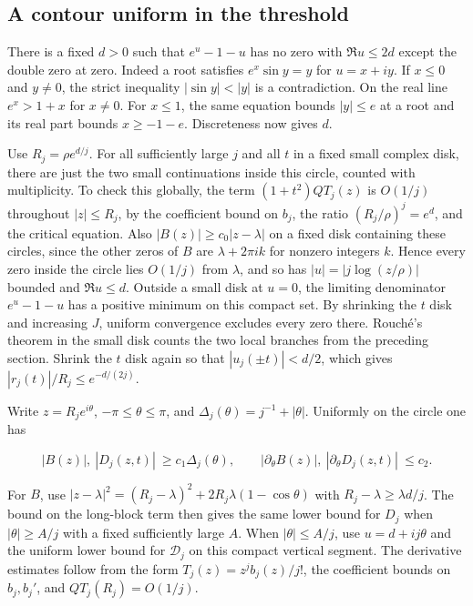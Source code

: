 \documentclass[11pt]{article}
\begin{document}
\subsection{A contour uniform in the threshold}
\label{sec:a-contour-uniform-in-the-threshold}

There is a fixed \(d>0\) such that \(e^u-1-u\) has no zero with \(\Re u\le2d\) except the double zero at zero. Indeed a root satisfies \(e^x\sin y=y\) for \(u=x+iy\). If \(x\le0\) and \(y\ne0\), the strict inequality \(|\sin y|<|y|\) is a contradiction. On the real line \(e^x>1+x\) for \(x\ne0\). For \(x\le1\), the same equation bounds \(|y|\le e\) at a root and its real part bounds \(x\ge-1-e\). Discreteness now gives \(d\).

Use \(R_j=\rho e^{d/j}\). For all sufficiently large \(j\) and all \(t\) in a fixed small complex disk, there are just the two small continuations inside this circle, counted with multiplicity. To check this globally, the term \((1+t^2)QT_j(z)\) is \(O(1/j)\) throughout \(|z|\le R_j\), by the coefficient bound on \(b_j\), the ratio \((R_j/\rho)^j=e^d\), and the critical equation. Also \(|B(z)|\ge c_0|z-\lambda|\) on a fixed disk containing these circles, since the other zeros of \(B\) are \(\lambda+2\pi i k\) for nonzero integers \(k\). Hence every zero inside the circle lies \(O(1/j)\) from \(\lambda\), and so has \(|u|=|j\log(z/\rho)|\) bounded and \(\Re u\le d\). Outside a small disk at \(u=0\), the limiting denominator \(e^u-1-u\) has a positive minimum on this compact set. By shrinking the \(t\) disk and increasing \(J\), uniform convergence excludes every zero there. Rouché's theorem in the small disk counts the two local branches from the preceding section. Shrink the \(t\) disk again so that \(|u_j(\pm t)|<d/2\), which gives \(|r_j(t)|/R_j\le e^{-d/(2j)}\).

Write \(z=R_j e^{i\theta}\), \(-\pi\le\theta\le\pi\), and \(\Delta_j(\theta)=j^{-1}+|\theta|\). Uniformly on the circle one has

\begin{equation*}
|B(z)|,\ |D_j(z,t)|\ \ge c_1\Delta_j(\theta),\qquad
|\partial_\theta B(z)|,\ |\partial_\theta D_j(z,t)|\ \le c_2.
\end{equation*}

For \(B\), use \(|z-\lambda|^2=(R_j-\lambda)^2+2R_j\lambda(1-\cos\theta)\) with \(R_j-\lambda\ge \lambda d/j\). The bound on the long-block term then gives the same lower bound for \(D_j\) when \(|\theta|\ge A/j\) with a fixed sufficiently large \(A\). When \(|\theta|\le A/j\), use \(u=d+ij\theta\) and the uniform lower bound for \(\mathcal D_j\) on this compact vertical segment. The derivative estimates follow from the form \(T_j(z)=z^jb_j(z)/j!\), the coefficient bounds on \(b_j,b_j'\), and \(QT_j(R_j)=O(1/j)\).
\end{document}

